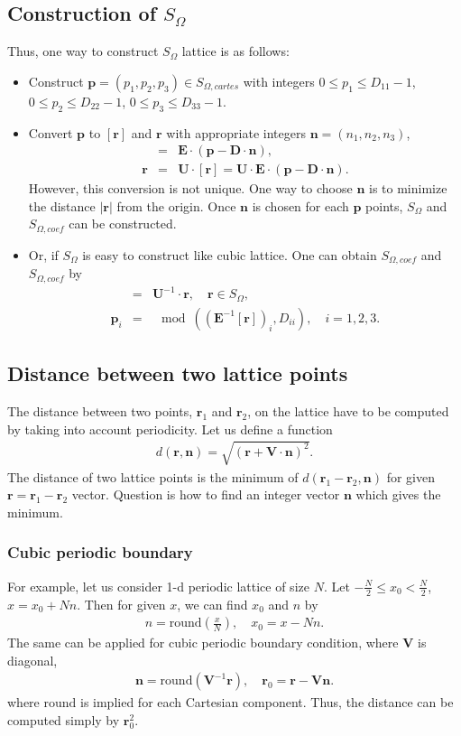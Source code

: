 \documentclass[10pt]{book}
\def\bm{\boldsymbol}
\newcommand{\bea}{\begin{eqnarray}}
\newcommand{\eea}{\end{eqnarray}}
\newcommand{\no}{\nonumber \\}
\def\vn{{\bm n}}
\def\vr{{\bm r}}
\begin{document}
\subsection{Construction of $S_\Omega$} 
{\color{red} Thus, one way to construct $S_\Omega$ lattice is as follows:}
\begin{itemize}
	\item Construct ${\bm p}=(p_1,p_2,p_3)\in S_{\Omega,cartes}$ with integers 
	     $0\leq p_1\leq D_{11}-1$, $0\leq p_2\leq D_{22}-1$, $0\leq p_3\leq D_{33}-1$.
	\item Convert ${\bm p}$ to $[\vr]$ and ${\vr}$ with appropriate integers 
	      ${\bm n}=(n_1,n_2,n_3)$, 
	     \bea
	     [\vr]&=&{\bm E}\cdot \left({\bm p}-{\bm D}\cdot{\bm n} \right) ,\no 
	     {\bm r}&=& {\bm U}\cdot [\vr]={\bm U}\cdot {\bm E}\cdot \left({\bm p}-{\bm D}\cdot{\bm n} \right). 
	     \eea  
	     However, this conversion is not unique. 
         One way to choose ${\bm n}$ is to minimize the distance $|{\bm r}|$ from the origin. 
         Once ${\bm n}$ is chosen for each ${\bm p}$ points,
         $S_{\Omega}$ and $S_{\Omega,coef}$ can be constructed.
    \item Or, if $S_\Omega$ is easy to construct like cubic lattice. One can obtain $S_{\Omega,coef}$
         and $S_{\Omega,coef}$ by  
         \bea 
           [\vr]&=&{\bm U}^{-1}\cdot \vr , \quad \vr \in S_\Omega,\no 
           {\bm p}_i &=&\mod( ({\bm E}^{-1}[\vr])_i, D_{ii} ) , \quad i=1,2,3.
         \eea 
         
\end{itemize}

\subsection{Distance between two lattice points}
The distance between two points, $\vr_1$ and $\vr_2$, on the lattice have to be 
computed by taking into account periodicity. 
Let us define a function
\bea 
d(\vr,\vn)=\sqrt{(\vr+{\bm V}\cdot\vn)^2}.
\eea 
The distance of two lattice points is the minimum of $d(\vr_1-\vr_2,\vn)$ for given $\vr=\vr_1-\vr_2$ vector.
Question is how to find an integer vector $\vn$ which gives the minimum.  

\subsubsection{Cubic periodic boundary} 
For example, let us consider 1-d periodic lattice of size $N$. 
Let $-\frac{N}{2}\leq x_0< \frac{N}{2}$, $x=x_0+N n$. 
Then for given $x$, we can find $x_0$ and $n$ by 
\bea 
n = \mbox{round}(\frac{x}{N}),\quad x_0=x-Nn.  
\eea 
The same can be applied for cubic periodic boundary condition, where ${\bm V}$ is diagonal,
\bea 
\vn= \mbox{round}({\bm V}^{-1}\vr),\quad \vr_0=\vr-{\bm V}\vn.   
\eea   
where $\mbox{round}$ is implied for each Cartesian component. 
Thus, the distance can be computed simply by $\vr_0^2$.
\end{document}
